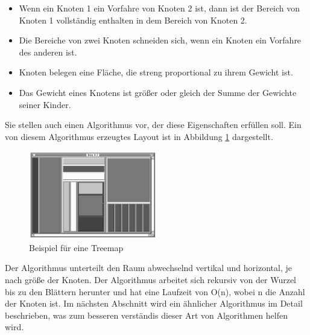 \begin{itemize}
    \item Wenn ein Knoten 1 ein Vorfahre von Knoten 2 ist, dann ist der Bereich von Knoten 1 vollständig enthalten in dem Bereich von Knoten 2.
    \item Die Bereiche von zwei Knoten schneiden sich, wenn ein Knoten ein Vorfahre des anderen ist.
    \item Knoten belegen eine Fläche, die streng proportional zu ihrem Gewicht ist.
    \item Das Gewicht eines Knotens ist größer oder gleich der Summe der Gewichte seiner Kinder.
\end{itemize}

Sie stellen auch einen Algorithmus vor, der diese Eigenschaften erfüllen soll. Ein von diesem Algorithmus erzeugtes Layout ist in Abbildung \ref{fig:nestedTreemap} dargestellt. 

\begin{figure}[ht]
    \centering
    \includegraphics[width=0.5\textwidth]{images/nestedTreemapDiagramm.png}
    \caption{Beispiel für eine Treemap}
    \label{fig:nestedTreemap}
\end{figure}

Der Algorithmus unterteilt den Raum abwechselnd vertikal und horizontal, je nach größe der Knoten. Der Algorithmus arbeitet sich rekursiv von der Wurzel bis zu den Blättern herunter und hat eine Laufzeit von O(n), wobei n die Anzahl der Knoten ist. Im nächsten Abschnitt wird ein ähnlicher Algorithmus im Detail beschrieben, was zum besseren verständis dieser Art von Algorithmen helfen wird.

